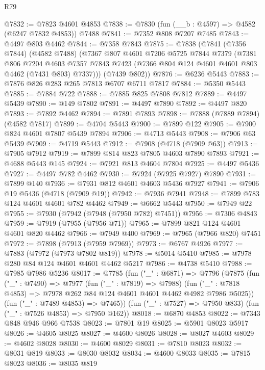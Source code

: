 \begin{lexlean}{R79}
\begin{coremodule}
@7832 := @7823 @4601 @4853
@7838 := @7830 (fun (__b : @4597) => @4582 (@6247 @7832 @4853)) @7488
@7841 := @7352 @808 @7207 @7485
@7843 := @4497 @803 @4462
@7844 := @7358 @7843
@7875 := @7838
    (@7841
      (@7356 @7844)
      (@4582 @7488)
      (@7367
        @807
        @4601
        @7206
        @5725
        @7844
        @7379
        (@7381
          @806
          @7204
          @4603
          @7357
          @7843
          @7423
          (@7366 @804 @124 @4601 @4601 @803 @4462 (@7431 @803) @7337)))
      (@7439 @802))
@7876 := @6236 @5443
@7883 := @7876 @826 @283 @265 @7813 @6707 @6711 @7817
@7884 := @5350 @5443
@7885 := @7884 @722
@7888 := @7885 @825 @7808 @7812
@7889 := @4497 @5439
@7890 := @149 @7802
@7891 := @4497 @7890
@7892 := @4497 @820
@7893 := @7892 @4462
@7894 := @7891 @7893
@7898 := @7888 (@7889 @7894) (@4582 @7817)
@7899 := @4704 @5443
@7900 := @7899 @122
@7905 := @7900 @824 @4601 @7807 @5439 @7894
@7906 := @4713 @5443
@7908 := @7906 @63 @5439
@7909 := @4719 @5443
@7912 := @7908 (@4718 (@7909 @63))
@7913 := @7905 @7912
@7919 := @7899 @814 @823 @7805 @4603 @7890 @7893
@7921 := @4688 @5443 @145
@7924 := @7921 @813 @4604 @7804
@7925 := @4497 @5436
@7927 := @4497 @782 @4462
@7930 := @7924 (@7925 @7927) @7890
@7931 := @7899 @140
@7936 := @7931 @812 @4601 @4603 @5436 @7927
@7941 := @7906 @19 @5436 (@4718 (@7909 @19))
@7942 := @7936 @7941
@7948 := @7899 @783 @124 @4601 @4601 @782 @4462
@7949 := @6662 @5443
@7950 := @7949 @22
@7955 := @7930 (@7942 (@7948 (@7950 @782) @7451))
@7956 := @7306 @4843
@7959 := @7919 (@7955 (@7956 @71))
@7965 := @7899 @821 @124 @4601 @4601 @820 @4462
@7966 := @7949 @400
@7969 := @7965 (@7966 @820) @7451
@7972 := @7898 (@7913 (@7959 @7969))
@7973 := @6767 @4926
@7977 := @7883 (@7972 (@7973 @7802 @819))
@7978 := @5014 @5410
@7985 := @7978 @280 @84 @124 @4601 @4601 @4462 @5217
@7986 := @4738 @5410
@7988 := @7985 @7986 @5236
@8017 := @7785
    (fun ("_" : @6871) =>
    @7796
      (@7875
        (fun ("_" : @7490) =>
        @7977
          (fun ("_" : @7819) => @7988)
          (fun ("_" : @7818 @4853) => @7978 @262 @84 @124 @4601 @4601 @4462 @4982 @7986 @5025))
        (fun ("_" : @7489 @4853) => @7465))
      (fun ("_" : @7527) => @7950 @833)
      (fun ("_" : @7526 @4853) => @7950 @162))
@8018 := @6870 @4853
@8022 := @7343 @848 @946 @966 @7538
@8023 := @7801 @19
@8025 := @5901 @8023 @5917
@8026 := @4605 @8025
@8027 := @4600 @8026
@8028 := @8027 @4603
@8029 := @4602 @8028
@8030 := @4600 @8029
@8031 := @7810 @8023
@8032 := @8031 @819
@8033 := @8030 @8032
@8034 := @4600 @8033
@8035 := @7815 @8023
@8036 := @8035 @819

\end{coremodule}
\end{lexlean}
